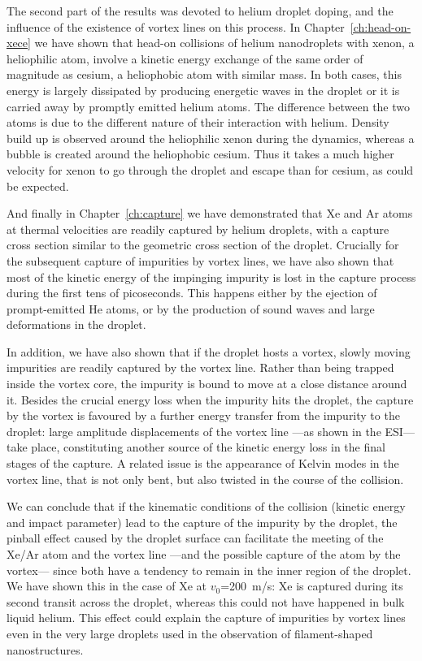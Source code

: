 The second part of the results was devoted to helium droplet doping, and the influence of the existence of vortex lines on this process. In Chapter~\ref{ch:head-on-xece} we have shown that head-on collisions of helium nanodroplets with xenon, a heliophilic atom, involve a kinetic energy exchange of the same order of magnitude as cesium, a heliophobic atom with similar mass. In both cases, this energy is largely dissipated by producing energetic waves in the droplet or it is carried away by promptly emitted helium atoms. The difference between the two atoms is due to the different nature of their interaction with helium. Density build up is observed around the heliophilic xenon during the dynamics, whereas a bubble is created around the heliophobic cesium. Thus it takes a much higher velocity for xenon to go through the droplet and escape than for cesium, as could be expected.

And finally in Chapter~\ref{ch:capture} we have demonstrated that Xe and Ar atoms at thermal velocities are readily captured by helium droplets, with a capture cross section similar to the geometric cross section of the droplet. Crucially for the subsequent capture of impurities by vortex lines, we have also shown that most of the kinetic energy of the impinging impurity is lost in the capture process during the first tens of picoseconds. This happens either by the ejection of prompt-emitted He atoms, or by the production of sound waves and large deformations in the droplet. 

In addition, we have also shown that if the droplet hosts a vortex, slowly moving impurities are readily captured by the vortex line. Rather than being trapped inside the vortex core, the impurity is bound to move at a close distance around it. Besides the crucial energy loss when the impurity hits the droplet, the capture by the vortex is favoured by a further energy transfer from the impurity to the droplet: large amplitude displacements of the vortex line ---as shown in the ESI\citep{ESI}--- take place, constituting another source of the kinetic energy loss in the final stages of the capture. A related issue is the appearance of Kelvin modes in the vortex line, that is not only bent, but also twisted in the course of the collision.

We can conclude that if the kinematic conditions of the collision (kinetic energy and impact parameter) lead to the capture of the impurity by the droplet, the pinball effect caused by the droplet surface can facilitate the meeting of the Xe/Ar atom and the vortex line ---and the possible capture of the atom by the vortex--- since both have a tendency to remain in the inner region of the droplet. We have shown this in the case of Xe at $v_0$=200~m/s: Xe is captured during its second transit across the droplet, whereas this could not have happened in bulk liquid helium\citep{Psh16}. This effect could explain the capture of impurities by vortex lines even in the very large droplets used in the observation of filament-shaped nanostructures.

